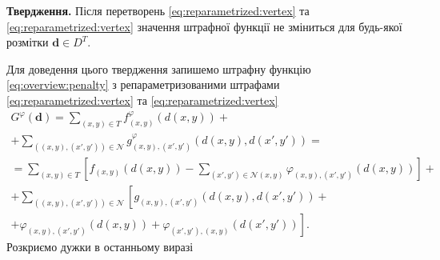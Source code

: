 \textbf{Твердження.}
Після перетворень \eqref{eq:reparametrized:vertex} та \eqref{eq:reparametrized:vertex}
значення штрафної функції не зміниться для будь-якої розмітки $\pmb{d} \in D^T$.

Для доведення цього твердження запишемо штрафну функцію
\eqref{eq:overview:penalty} з репараметризованими штрафами
\eqref{eq:reparametrized:vertex} та \eqref{eq:reparametrized:vertex}
\begin{equation*}
\begin{gathered}
    G^{\varphi} \left( \pmb{d} \right)
    = \sum \limits_{\left(x, y \right) \in T}
        f_{\left(x, y \right)}^{\varphi} \left(
            d \left(x, y \right)
        \right) + \\
    + \sum \limits_{\left(\left(x, y \right), \left(x', y'\right) \right) \in \mathcal{N}}
        g_{\left(x, y \right), \left(x', y' \right)}^{\varphi} \left(
            d \left( x, y \right), d \left( x', y' \right)
        \right) = \\
    = \sum \limits_{\left(x, y \right) \in T} \left[
        f_{\left(x, y \right)} \left( d \left(x, y \right) \right)
        - \sum \limits_{\left(x', y' \right) \in \mathcal{N} \left(x, y \right)}
            \varphi_{\left(x, y \right), \left(x', y' \right)} \left(
                d \left(x, y \right)
            \right)
        \right] + \\
        + \sum \limits_{\left(\left(x, y \right), \left(x', y'\right) \right) \in \mathcal{N}}
            \left[
                g_{\left(x, y \right), \left(x', y' \right)} \left(
                    d \left(x, y \right), d \left(x', y' \right)
                \right) + \right. \\
                \left.
                + \varphi_{\left(x, y \right), \left(x', y' \right)}
                    \left( d \left(x, y \right)
                \right)
                + \varphi_{\left(x', y' \right), \left(x, y \right)}
                    \left( d \left(x', y' \right)
                \right)
            \right].
\end{gathered}
\end{equation*}
Розкриємо дужки в останньому виразі
